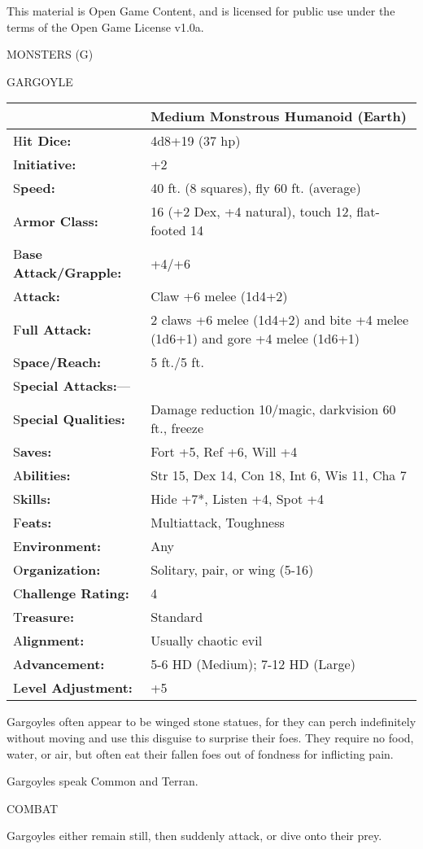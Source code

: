 \documentclass{article}
\begin{document}
This material is Open Game Content, and is licensed for public use under the terms 
of the Open Game License v1.0a.

{\LARGE{}MONSTERS (G)}

\vspace{12pt}
{\LARGE{}GARGOYLE}

\begin{tabular}{|>{\raggedright}p{91pt}|>{\raggedright}p{195pt}|}
\hline
  & Medium Monstrous Humanoid (Earth)\tabularnewline
\hline
H\textbf{it Dice:} & 4d8+19 (37 hp)\tabularnewline
\hline
I\textbf{nitiative:} & +2\tabularnewline
\hline
S\textbf{peed:} & 40 ft. (8 squares), fly 60 ft. (average)\tabularnewline
\hline
A\textbf{rmor Class:} & 16 (+2 Dex, +4 natural), touch 12, flat-footed 14\tabularnewline
\hline
B\textbf{ase Attack/Grapple:} & +4/+6\tabularnewline
\hline
A\textbf{ttack:} & Claw +6 melee (1d4+2)\tabularnewline
\hline
F\textbf{ull Attack:} & 2 claws +6 melee (1d4+2) and bite +4 melee (1d6+1) and 
gore +4 melee (1d6+1)\tabularnewline
\hline
S\textbf{pace/Reach:} & 5 ft./5 ft.\tabularnewline
\hline
S\textbf{pecial Attacks:}--- & \tabularnewline
\hline
S\textbf{pecial Qualities:} & Damage reduction 10/magic, darkvision 60 ft., freeze\tabularnewline
\hline
S\textbf{aves:} & Fort +5, Ref +6, Will +4\tabularnewline
\hline
A\textbf{bilities:} & Str 15, Dex 14, Con 18, Int 6, Wis 11, Cha 7\tabularnewline
\hline
S\textbf{kills:} & Hide +7*, Listen +4, Spot +4\tabularnewline
\hline
F\textbf{eats:} & Multiattack, Toughness\tabularnewline
\hline
E\textbf{nvironment:} & Any\tabularnewline
\hline
O\textbf{rganization:} & Solitary, pair, or wing (5-16)\tabularnewline
\hline
C\textbf{hallenge Rating:} & 4\tabularnewline
\hline
T\textbf{reasure:} & Standard\tabularnewline
\hline
A\textbf{lignment:} & Usually chaotic evil\tabularnewline
\hline
A\textbf{dvancement:} & 5-6 HD (Medium); 7-12 HD (Large)\tabularnewline
\hline
L\textbf{evel Adjustment:} & +5\tabularnewline
\hline
\end{tabular}

Gargoyles often appear to be winged stone statues, for they can perch indefinitely 
without moving and use this disguise to surprise their foes. They require no food, 
water, or air, but often eat their fallen foes out of fondness for inflicting pain. 

Gargoyles speak Common and Terran.

COMBAT

Gargoyles either remain still, then suddenly attack, or dive onto their prey.
\end{document}
